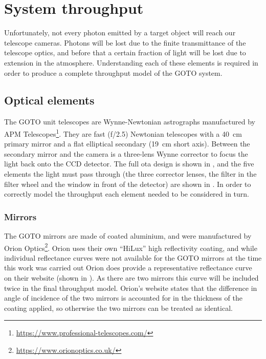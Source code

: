 \section{System throughput}
\label{sec:throughput}
\begin{colsection}


\begin{colsection}

Unfortunately, not every photon emitted by a target object will reach our telescope cameras. Photons will be lost due to the finite transmittance of the telescope optics, and before that a certain fraction of light will be lost due to extension in the atmosphere. Understanding each of these elements is required in order to produce a complete throughput model of the GOTO system.

\end{colsection}

\subsection{Optical elements}
\label{sec:optics}
\begin{colsection}

The GOTO unit telescopes are Wynne-Newtonian astrographs manufactured by APM Telescopes\footnote{\url{https://www.professional-telescopes.com/}}. They are fast (f/2.5) Newtonian telescopes with a \SI{40}{\centi\meter} primary mirror and a flat elliptical secondary (\SI{19}{\centi\metre} short axis). Between the secondary mirror and the camera is a three-lens Wynne corrector to focus the light back onto the CCD detector. The full \gls{ota} design is shown in , and the five elements the light must pass through (the three corrector lenses, the filter in the filter wheel and the window in front of the detector) are shown in . In order to correctly model the throughput each element needed to be considered in turn.

\subsubsection{Mirrors}

The GOTO mirrors are made of coated aluminium, and were manufactured by Orion Optics\footnote{\url{https://www.orionoptics.co.uk/}}. Orion uses their own ``HiLux'' high reflectivity coating, and while individual reflectance curves were not available for the GOTO mirrors at the time this work was carried out Orion does provide a representative reflectance curve on their website (shown in ). As there are two mirrors this curve will be included twice in the final throughput model. Orion's website states that the difference in angle of incidence of the two mirrors is accounted for in the thickness of the coating applied, so otherwise the two mirrors can be treated as identical.


\end{colsection}
\end{colsection}
